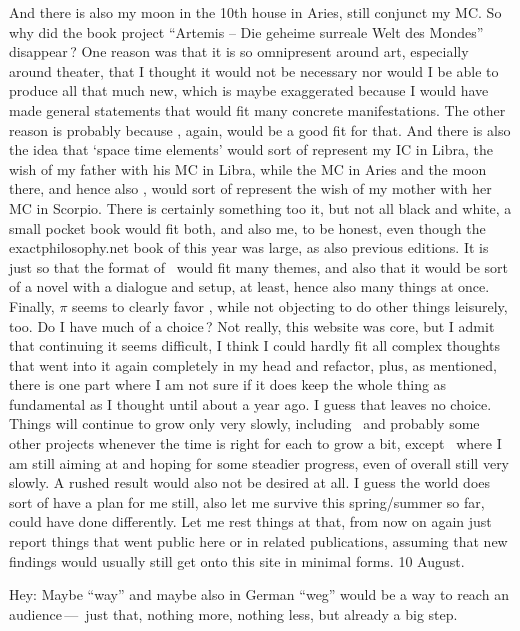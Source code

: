 \begin{itemize}
And there is also my moon in the 10th house in Aries,
still conjunct my MC.
%
So why did the book project “Artemis – Die geheime surreale Welt des Mondes” disappear\,?
%
One reason was that it is so omnipresent around art,
especially around theater,
that I thought it would not be necessary
nor would I be able to produce all that much new,
which is maybe exaggerated
because I would have made general statements
that would fit many concrete manifestations.
%
The other reason is probably because \ELEMENTAL,
again,
would be a good fit for that.
%
And there is also the idea
that ‘space time elements’ would sort of represent my IC in Libra,
the wish of my father with his MC in Libra,
while the MC in Aries and the moon there,
and hence also \ELEMENTAL,
would sort of represent the wish of my mother with her MC in Scorpio.
%
There is certainly something too it,
but not all black and white,
a small pocket book would fit both,
and also me,
to be honest,
even though the exactphilosophy.net book of this year was large,
as also previous editions.
%
It is just so that the format of \ELEMENTAL\ would fit many themes,
and also that it would be sort of a novel with a dialogue and setup, at least,
hence also many things at once.
%
Finally,
$\pi$ seems to clearly favor \ELEMENTAL,
while not objecting to do other things leisurely, too.
%
Do I have much of a choice\,?
%
Not really,
this website was core,
but I admit that continuing it seems difficult,
I think I could hardly fit all complex thoughts
that went into it again completely in my head and refactor,
plus,
as mentioned,
there is one part where I am not sure
if it does keep the whole thing as fundamental
as I thought until about a year ago.
%
I guess that leaves no choice.
%
Things will continue to grow only very slowly,
including \ELEMENTAL\
and probably some other projects
whenever the time is right for each to grow a bit,
except \ELEMENTAL\
where I am still aiming at and hoping for some steadier progress,
even of overall still very slowly.
%
A rushed result would also not be desired at all.
%
I guess the world does sort of have a plan for me still,
also let me survive this spring/summer so far,
could have done differently.
%
Let me rest things at that,
from now on again just report things that went public here or in related publications,
assuming that new findings would usually still get onto this site in minimal forms.
%
10 August.

Hey:
Maybe “way” and maybe also in German “weg”
would be a way to reach an audience\,—\,%
just that, nothing more, nothing less, but already a big step.


\end{itemize}
